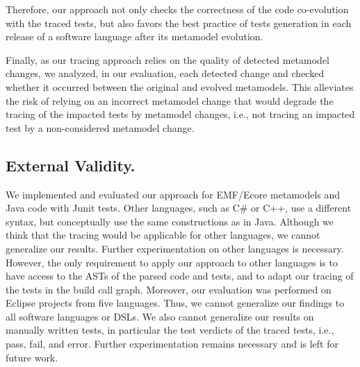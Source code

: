 Therefore, our approach not only checks the correctness of the code co-evolution with the traced tests, but also favors the best practice of tests generation in each release of a software language after its metamodel evolution.

Finally, as our tracing approach relies on the quality of detected metamodel changes, we analyzed, in our evaluation, each detected change and checked whether it occurred between the original and evolved metamodels. This alleviates the risk of relying on an incorrect metamodel change that would degrade the tracing of the impacted tests by metamodel changes, i.e., not tracing an impacted test by a non-considered metamodel change. 

\subsection{External Validity.} 
We implemented and evaluated our approach for EMF/Ecore metamodels and Java code with Junit tests. Other languages, such as C\# or C++, use a different syntax, but conceptually use the same constructions as in Java.
Although we think that the tracing would be applicable for other languages, we cannot generalize our results. Further experimentation on other languages is necessary. However, the only requirement to apply our approach to other languages is to have access to the ASTs of the parsed code and tests, and to adapt our tracing of the tests in the build call graph. 
%
Moreover, our evaluation was performed on Eclipse projects from five languages. Thus, we cannot generalize our findings to all software languages or DSLs. We also cannot generalize our results on manually written tests, in particular the test verdicts of the traced tests, i.e., pass, fail, and error. Further experimentation remains necessary and is left for future work. %

